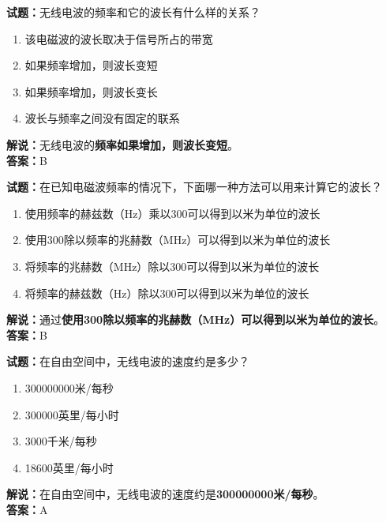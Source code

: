 \documentclass{ctexbook}
\begin{document}
\noindent\textbf{试题：}无线电波的频率和它的波长有什么样的关系？

\begin{enumerate}[leftmargin=3em]
  \item 该电磁波的波长取决于信号所占的带宽
  \item 如果频率增加，则波长变短
  \item 如果频率增加，则波长变长
  \item 波长与频率之间没有固定的联系
\end{enumerate}

\noindent\textbf{解说：}无线电波的\textbf{频率如果增加，则波长变短}。\\\noindent\textbf{答案：}B

\vspace{\baselineskip}

\noindent\textbf{试题：}在已知电磁波频率的情况下，下面哪一种方法可以用来计算它的波长？

\begin{enumerate}[leftmargin=3em]
  \item 使用频率的赫兹数（Hz）乘以300可以得到以米为单位的波长
  \item 使用300除以频率的兆赫数（\si{\MHz}）可以得到以米为单位的波长
  \item 将频率的兆赫数（\si{\MHz}）除以300可以得到以米为单位的波长
  \item 将频率的赫兹数（Hz）除以300可以得到以米为单位的波长
\end{enumerate}

\noindent\textbf{解说：}通过\textbf{使用300除以频率的兆赫数（\si{\MHz}）可以得到以米为单位的波长}。\\\noindent\textbf{答案：}B

\vspace{\baselineskip}

\noindent\textbf{试题：}在自由空间中，无线电波的速度约是多少？

\begin{enumerate}[leftmargin=3em]
  \item 300000000米/每秒
  \item 300000英里/每小时
  \item 3000千米/每秒
  \item 18600英里/每小时
\end{enumerate}

\noindent\textbf{解说：}在自由空间中，无线电波的速度约是\textbf{300000000米/每秒}。\\\noindent\textbf{答案：}A
\end{document}

